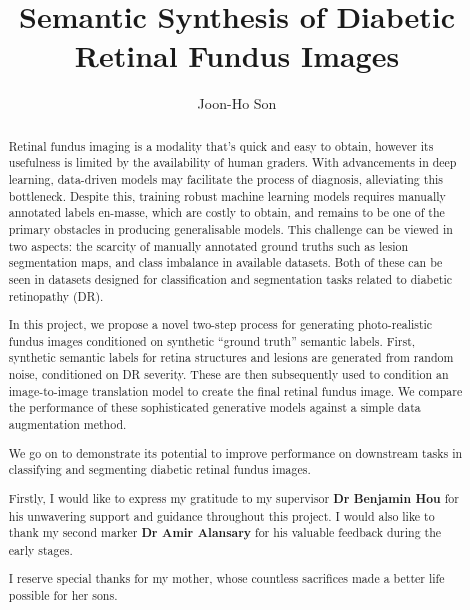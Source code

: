 \documentclass[a4paper, 11pt, twoside]{report}
\title{Semantic Synthesis of Diabetic \\ \vspace{0.1cm} Retinal Fundus Images}
\author{Joon-Ho Son}
\begin{document}


\makeatletter
\def\@makechapterhead#1{%
  {\parindent \z@ \raggedright \normalfont
    \ifnum \c@secnumdepth >\m@ne
        \huge\bfseries \@chapapp\space \thechapter
        \par\nobreak
        \vskip 15\p@
    \fi
    \interlinepenalty\@M
    \Huge \bfseries #1\par\nobreak
    \vskip 30\p@
  }}
\def\@makeschapterhead#1{%
  {\parindent \z@ \raggedright
    \normalfont
    \interlinepenalty\@M
    \Huge \bfseries  #1\par\nobreak
    \vskip 30\p@
  }}
\makeatother

\begin{abstract}
Retinal fundus imaging is a modality that’s quick and easy to obtain, however its usefulness is limited by the availability of human graders.
With advancements in deep learning, data-driven models may facilitate the process of diagnosis, alleviating this bottleneck. 
Despite this, training robust machine learning models requires manually annotated labels en-masse, which are costly to obtain, and remains to be one of the primary obstacles in producing generalisable models. 
This challenge can be viewed in two aspects: the scarcity of manually annotated ground truths such as lesion segmentation maps, and class imbalance in available datasets.
Both of these can be seen in datasets designed for classification and segmentation tasks related to diabetic retinopathy (DR).

In this project, we propose a novel two-step process for generating photo-realistic fundus images conditioned on synthetic ``ground truth'' semantic labels.
First, synthetic semantic labels for retina structures and lesions are generated from random noise, conditioned on DR severity. 
These are then subsequently used to condition an image-to-image translation model to create the final retinal fundus image.
We compare the performance of these sophisticated generative models against a simple data augmentation method.

We go on to demonstrate its potential to improve performance on downstream tasks in classifying and segmenting diabetic retinal fundus images. 
\end{abstract}

\renewcommand{\abstractname}{Acknowledgements}
\begin{abstract}
Firstly, I would like to express my gratitude to my supervisor \textbf{Dr Benjamin Hou} for his unwavering support and guidance throughout this project.
I would also like to thank my second marker \textbf{Dr Amir Alansary} for his valuable feedback during the early stages.

I reserve special thanks for my mother, whose countless sacrifices made a better life possible for her sons.
\end{abstract}
\end{document}
